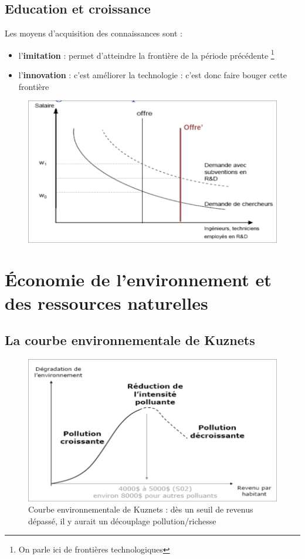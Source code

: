 \subsection{Education et croissance}
Les moyens d'acquisition des connaissances sont :
\begin{itemize}
    \item l'\textbf{imitation} : permet d’atteindre la frontière de la période précédente \footnote{On parle ici de frontières technologiques}
    \item l'\textbf{innovation} : c’est améliorer la technologie : c’est donc faire bouger cette frontière
\end{itemize}
\newpage
\begin{figure}[hbt!]
    \centering
    \includegraphics[scale=0.3]{Pics/innovation_enseingment_sup.png}
\end{figure}
\section{Économie de l’environnement et des ressources naturelles}
\subsection{La courbe environnementale de Kuznets}
\begin{figure}[hbt!]
    \centering
    \includegraphics[scale=0.3]{Pics/courbe_environnementale_de_Kuznets.png}
    \caption{Courbe environnementale de Kuznets : dès un seuil de revenus dépassé, il y aurait un découplage pollution/richesse}
\end{figure}